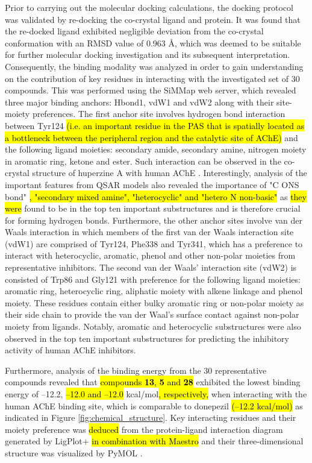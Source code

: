 \documentclass[fleqn,10pt]{wlpeerj}
\begin{document}
Prior to carrying out the molecular docking calculations, the docking protocol was validated by re-docking the co-crystal ligand and protein. It was found that the re-docked ligand exhibited negligible deviation from the co-crystal conformation with an RMSD value of 0.963 {\AA}, which was deemed to be suitable for further molecular docking investigation and its subsequent interpretation. Consequently, the binding modality was analyzed in order to gain understanding on the contribution of key residues in interacting with the investigated set of 30 compounds. This was performed using the SiMMap web server, which revealed three major binding anchors: Hbond1, vdW1 and vdW2 along with their site-moiety preferences. The first anchor site involves hydrogen bond interaction between Tyr124 \hl{(i.e. an important residue in the PAS that is spatially located as a bottleneck between the peripheral region and the catalytic site of AChE)} and the following ligand moieties: secondary amide, secondary amine, nitrogen moiety in aromatic ring, ketone and ester. Such interaction can be observed in the co-crystal structure of huperzine A with human AChE \citep{doi:10.1021/jm300871x}. Interestingly, analysis of the important features from QSAR models also revealed the importance of "C ONS bond" \hl{, "secondary mixed amine", "heterocyclic" and "hetero N non-basic"} as \hl{they were} found to be in the top ten important substructures and is therefore crucial for forming hydrogen bonds. Furthermore, the other anchor sites involve van der Waals interaction in which members of the first van der Waals interaction site (vdW1) are comprised of Tyr124, Phe338 and Tyr341, which has a preference to interact with heterocyclic, aromatic, phenol and other non-polar moieties from representative inhibitors. The second van der Waals' interaction site (vdW2) is consisted of Trp86 and Gly121 with preference for the following ligand moieties: aromatic ring, heterocyclic ring, aliphatic moiety with alkene linkage and phenol moiety. These residues contain either bulky aromatic ring or non-polar moiety as their side chain to provide the van der Waal's surface contact against non-polar moiety from ligands. Notably, aromatic and heterocyclic substructures were also observed in the top ten important substructures for predicting the inhibitory activity of human AChE inhibitors.

Furthermore, analysis of the binding energy from the 30 representative compounds revealed that \hl{compounds \textbf{13}, \textbf{5} and \textbf{28}} exhibited the lowest binding energy of --12.2, \hl{--12.0 and --12.0} kcal/mol\hl{, respectively,} when interacting with the human AChE binding site, which is comparable to donepezil \hl{(--12.2 kcal/mol)} as indicated in Figure \ref{fig:chemical_structure}. Key interacting residues and their moiety preference was \hl{deduced} from the protein-ligand interaction diagram generated by LigPlot+ \citep{Wallace01021995} \hl{in combination with Maestro} \citep{maestro2015} and their three-dimensional structure was visualized by PyMOL \citep{pymol2015}.
\end{document}
